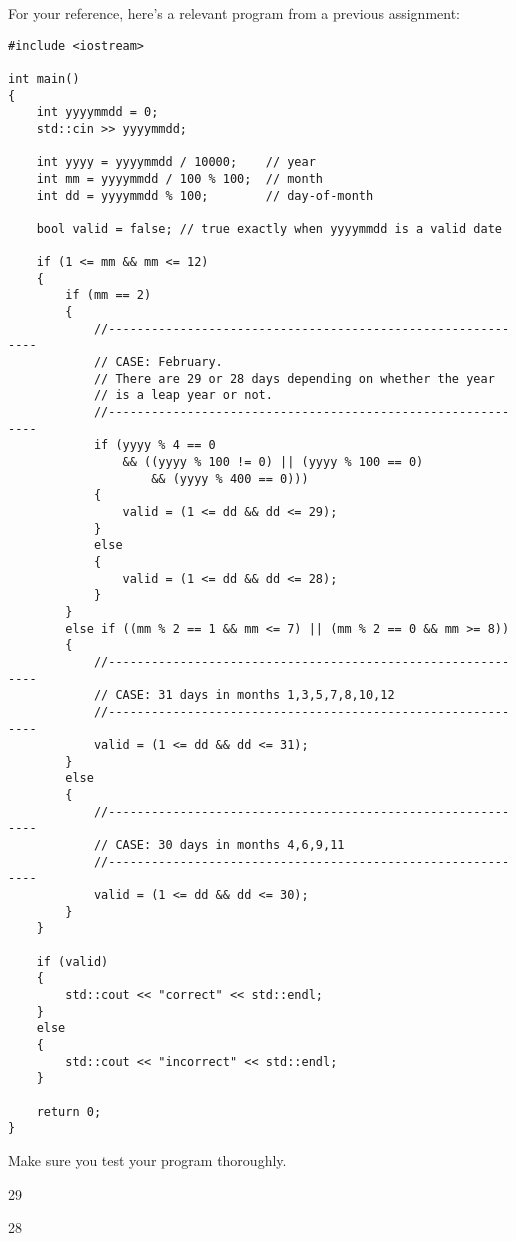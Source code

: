 For your reference, here's a relevant program from a previous assignment:
\begin{Verbatim}[frame=single]
#include <iostream>

int main()
{
    int yyyymmdd = 0;
    std::cin >> yyyymmdd;
    
    int yyyy = yyyymmdd / 10000;    // year
    int mm = yyyymmdd / 100 % 100;  // month
    int dd = yyyymmdd % 100;        // day-of-month
        
    bool valid = false; // true exactly when yyyymmdd is a valid date
    
    if (1 <= mm && mm <= 12)
    {
        if (mm == 2)
        {
            //------------------------------------------------------------
            // CASE: February. 
            // There are 29 or 28 days depending on whether the year
            // is a leap year or not. 
            //------------------------------------------------------------
            if (yyyy % 4 == 0 
                && ((yyyy % 100 != 0) || (yyyy % 100 == 0) 
                    && (yyyy % 400 == 0)))
            {
                valid = (1 <= dd && dd <= 29);
            }
            else
            {
                valid = (1 <= dd && dd <= 28);
            }
        }
        else if ((mm % 2 == 1 && mm <= 7) || (mm % 2 == 0 && mm >= 8))
        {
            //------------------------------------------------------------
            // CASE: 31 days in months 1,3,5,7,8,10,12
            //------------------------------------------------------------
            valid = (1 <= dd && dd <= 31);
        }
        else
        {
            //------------------------------------------------------------
            // CASE: 30 days in months 4,6,9,11
            //------------------------------------------------------------
            valid = (1 <= dd && dd <= 30);
        }
    }
    
    if (valid) 
    {
        std::cout << "correct" << std::endl;
    }
    else
    {
        std::cout << "incorrect" << std::endl;
    }

    return 0;
}
\end{Verbatim}

Make sure you test your program thoroughly.

\resett
\nextt
\begin{console}[frame=single, commandchars=\\\{\}]
29
\end{console}

\nextt
\begin{console}[frame=single, commandchars=\\\{\}]
28
\end{console}


